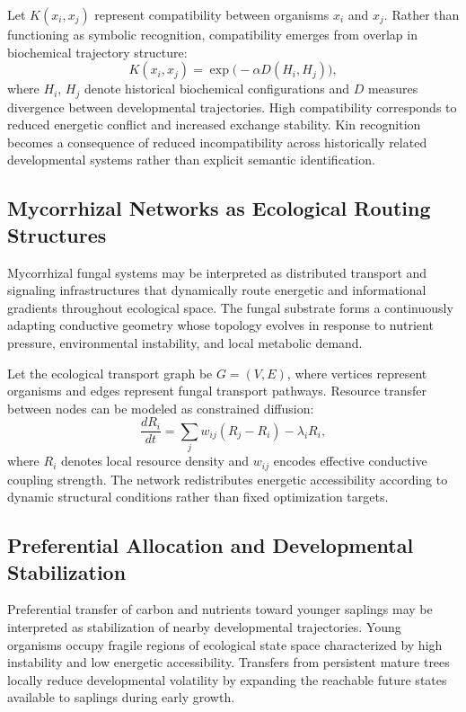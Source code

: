 \claimP Let $K(x_i,x_j)$ represent compatibility between organisms $x_i$ and
$x_j$. Rather than functioning as symbolic recognition, compatibility emerges from
overlap in biochemical trajectory structure:
\[
  K(x_i,x_j) = \exp\bigl(-\alpha D(H_i,H_j)\bigr),
\]
where $H_i$, $H_j$ denote historical biochemical configurations and $D$ measures
divergence between developmental trajectories. High compatibility corresponds to
reduced energetic conflict and increased exchange stability. Kin recognition
becomes a consequence of reduced incompatibility across historically related
developmental systems rather than explicit semantic identification.

\subsection{Mycorrhizal Networks as Ecological Routing Structures}

\claimP Mycorrhizal fungal systems may be interpreted as distributed transport
and signaling infrastructures that dynamically route energetic and informational
gradients throughout ecological space. The fungal substrate forms a continuously
adapting conductive geometry whose topology evolves in response to nutrient
pressure, environmental instability, and local metabolic demand.

Let the ecological transport graph be $G = (V,E)$, where vertices represent
organisms and edges represent fungal transport pathways. Resource transfer between
nodes can be modeled as constrained diffusion:
\[
  \frac{dR_i}{dt} = \sum_j w_{ij}(R_j - R_i) - \lambda_i R_i,
\]
where $R_i$ denotes local resource density and $w_{ij}$ encodes effective
conductive coupling strength. The network redistributes energetic accessibility
according to dynamic structural conditions rather than fixed optimization targets.

\subsection{Preferential Allocation and Developmental Stabilization}

\claimP Preferential transfer of carbon and nutrients toward younger saplings may
be interpreted as stabilization of nearby developmental trajectories. Young
organisms occupy fragile regions of ecological state space characterized by high
instability and low energetic accessibility. Transfers from persistent mature trees
locally reduce developmental volatility by expanding the reachable future states
available to saplings during early growth.

